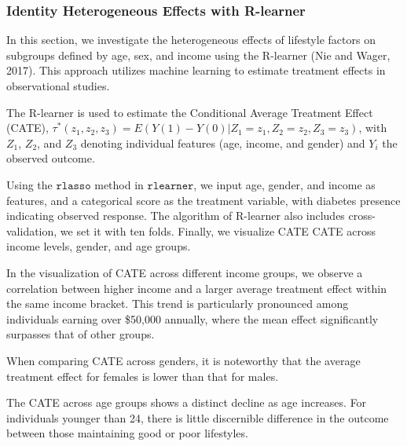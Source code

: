 \documentclass[
  12pt,
]{article}
\begin{document}
\hypertarget{identity-heterogeneous-effects-with-r-learner}{%
\subsubsection{Identity Heterogeneous Effects with
R-learner}\label{identity-heterogeneous-effects-with-r-learner}}

In this section, we investigate the heterogeneous effects of lifestyle
factors on subgroups defined by age, sex, and income using the R-learner
(Nie and Wager, 2017). This approach utilizes machine learning to
estimate treatment effects in observational studies.

The R-learner is used to estimate the Conditional Average Treatment
Effect (CATE),
\(\tau^*(z_1,z_2,z_3) = E(Y(1)-Y(0)|Z_1=z_1,Z_2 = z_2,Z_3 = z_3)\), with
\(Z_1\), \(Z_2\), and \(Z_3\) denoting individual features (age, income,
and gender) and \(Y_i\) the observed outcome.

Using the \(\texttt{rlasso}\) method in \(\texttt{rlearner}\), we input
age, gender, and income as features, and a categorical score as the
treatment variable, with diabetes presence indicating observed response.
The algorithm of R-learner also includes cross-validation, we set it
with ten folds. Finally, we visualize CATE CATE across income levels,
gender, and age groups.

In the visualization of CATE across different income groups, we observe
a correlation between higher income and a larger average treatment
effect within the same income bracket. This trend is particularly
pronounced among individuals earning over \$50,000 annually, where the
mean effect significantly surpasses that of other groups.

When comparing CATE across genders, it is noteworthy that the average
treatment effect for females is lower than that for males.

The CATE across age groups shows a distinct decline as age increases.
For individuals younger than 24, there is little discernible difference
in the outcome between those maintaining good or poor lifestyles.
\end{document}
